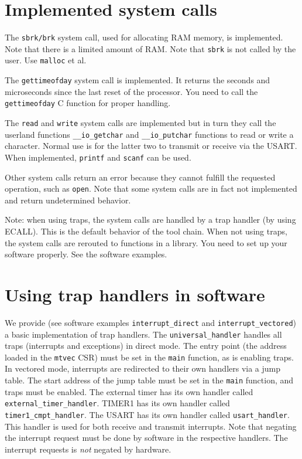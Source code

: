 \documentclass[12pt]{article}
\begin{document}
\section{Implemented system calls}
The \texttt{sbrk/brk} system call, used for allocating RAM memory, is implemented. Note that there is a limited amount of RAM. Note that \texttt{sbrk} is not called by the user. Use \texttt{malloc} et al.

The \texttt{gettimeofday} system call is implemented. It returns the seconds and microseconds since the last reset of the processor. You need to call the \texttt{gettimeofday} C function for proper handling. %

The \texttt{read} and \texttt{write} system calls are implemented but in turn they call the userland functions \texttt{\_\_io\_getchar} and \texttt{\_\_io\_putchar} functions to read or write a character. Normal use is for the latter two to transmit or receive via the USART. When implemented, \texttt{printf} and \texttt{scanf} can be used.

Other system calls return an error because they cannot fulfill the requested operation, such as \texttt{open}. Note that some system calls are in fact not implemented and return undetermined behavior. 

Note: when using traps, the system calls are handled by a trap handler (by using ECALL). This is the default behavior of the tool chain. When not using traps, the system calls are rerouted to functions in a library. You need to set up your software properly. See the software examples.

\section{Using trap handlers in software}
We provide (see software examples \texttt{interrupt\_direct} and \texttt{interrupt\_vectored}) a basic implementation of trap handlers. The \texttt{universal\_handler} handles all traps (interrupts and exceptions) in direct mode. The entry point (the address loaded in the \texttt{mtvec} CSR) must be set in the \texttt{main} function, as is enabling traps. In vectored mode, interrupts are redirected to their own handlers via a jump table. The start address of the jump table must be set in the \texttt{main} function, and traps must be enabled. The external timer has its own handler called \texttt{external\_timer\_handler}. TIMER1 has its own handler called \texttt{timer1\_cmpt\_handler}. The USART has its own handler called \texttt{usart\_handler}. This handler is used for both receive and transmit interrupts. Note that negating the interrupt request must be done by software in the respective handlers. The interrupt requests is \emph{not} negated by hardware.
\end{document}
